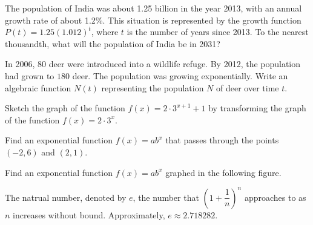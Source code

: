\begin{example}
  The population of India was about 1.25 billion in the year 2013, with an annual growth rate of about  1.2\%. This situation is represented by the growth function  $P(t)=1.25(1.012)^t$, where $t$ is the number of years since 2013. To the nearest thousandth, what will the population of India be in 2031?
\end{example}

\begin{example}
  In 2006, $80$ deer were introduced into a wildlife refuge. By 2012, the population had grown to $180$ deer. The population was growing exponentially. Write an algebraic function $N(t)$ representing the population $N$ of deer over time $t$.
\end{example}

\newpage

\begin{example}
  Sketch the graph of the function $f(x)=2\cdot 3^{x+1}+1$ by transforming the graph of the function $f(x)=2\cdot 3^x$.
\end{example}

\begin{example}
  Find an exponential function $f(x)=ab^x$ that passes through the points $(-2,6)$ and $(2,1)$.
\end{example}

\begin{example}
  Find an exponential function $f(x)=ab^x$ graphed in the following figure.\\
\end{example}

\vspace*{-0.3\textheight}

\newpage

\begin{definition}
The natrual number, denoted by $e$, the number that 
${\left (1+\dfrac{1}{n} \right )}^n$ approaches to as $n$ increases without bound. Approximately, $e\approx 2.718282$.
\end{definition}



